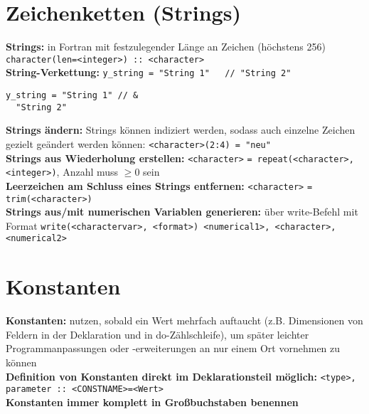 \documentclass[a4paper, twocolumn]{scrarticle}
\begin{document}
\section{Zeichenketten (\glqq Strings\grqq)}
\textbf{Strings:} in Fortran mit festzulegender Länge an Zeichen  (höchstens 256) \lstinline|character(len=<integer>) :: <character>|\\
\textbf{String-Verkettung:} \lstinline|y_string = "String 1"   // "String 2"|
\begin{lstlisting}[caption={\bfseries Beispiel: String-Verkettung über Code-Zeilen hinweg},label=lst:stringkette]
  y_string = "String 1" // &
  "String 2"
\end{lstlisting}
\textbf{Strings ändern:} Strings können indiziert werden, sodass auch einzelne Zeichen gezielt geändert werden können: \lstinline|<character>(2:4) = "neu"|\\
\textbf{Strings aus Wiederholung erstellen:} \lstinline|<character>| \lstinline|= repeat(<character>, <integer>)|, Anzahl muss $\geq 0$ sein\\
\textbf{Leerzeichen am Schluss eines Strings entfernen:} \lstinline|<character>| \lstinline|= trim(<character>)| \\
\textbf{Strings aus/mit numerischen Variablen generieren:} über write-Befehl mit Format \lstinline|write(<charactervar>, <format>) <numerical1>, <character>, <numerical2>|

\section{Konstanten}
\textbf{Konstanten:} nutzen, sobald ein Wert mehrfach auftaucht (z.B. Dimensionen von Feldern in der Deklaration und in do-Zählschleife), um später leichter Programmanpassungen oder -erweiterungen an nur einem Ort vornehmen zu können\\
\textbf{Definition von Konstanten direkt im Deklarationsteil möglich:} \lstinline|<type>, parameter :: <CONSTNAME>=<Wert>| \\
\textbf{Konstanten immer komplett in Großbuchstaben benennen}
\end{document}
